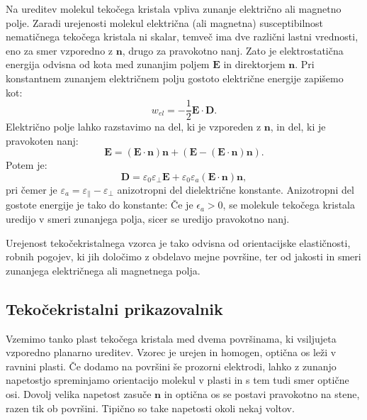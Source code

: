 Na ureditev molekul tekočega kristala vpliva zunanje električno ali magnetno polje.
Zaradi urejenosti molekul električna (ali magnetna) susceptibilnost nematičnega tekočega
kristala ni skalar, temveč ima dve različni lastni vrednosti,
eno za smer vzporedno z $\mathbf{n}$, drugo za pravokotno nanj. Zato je
elektrostatična energija odvisna od kota med zunanjim poljem $\mathbf{E}$
in direktorjem $\mathbf{n}$. Pri konstantnem zunanjem električnem polju 
gostoto električne energije zapišemo kot:
\begin{equation}
w_{el}=-\frac{1}{2}\mathbf{E}\cdot \mathbf{D}.
\label{lcwe}
\end{equation}
Električno polje lahko razstavimo na del, ki je vzporeden z $\mathbf{n}$, in del, ki je
pravokoten nanj:
\begin{equation}
\mathbf{E} = (\mathbf{E} \cdot \mathbf{n}) \mathbf{n} + \left( \mathbf{E} - 
(\mathbf{E} \cdot \mathbf{n}) \mathbf{n} \right)\!\!.
\end{equation}
Potem je:
\begin{equation}
\mathbf{D} = \varepsilon_0 \varepsilon_\bot \mathbf{E} + \varepsilon_0 \varepsilon_a
(\mathbf{E}\cdot\mathbf{n})\mathbf{n},
\label{7.56a}
\end{equation}
pri čemer je $\varepsilon_a = \varepsilon_\parallel - \varepsilon_\bot$ anizotropni
del dielektrične konstante. Anizotropni del gostote energije je tako do konstante:
Če je $\epsilon_{a}>0$, se molekule tekočega kristala uredijo v smeri 
zunanjega polja, sicer se uredijo pravokotno nanj.

Urejenost tekočekristalnega vzorca je tako odvisna od orientacijske
elastičnosti, robnih pogojev, ki jih določimo z obdelavo mejne
površine, ter od jakosti in smeri zunanjega električnega ali magnetnega polja.

\subsection*{Tekočekristalni prikazovalnik}
Vzemimo tanko plast tekočega kristala med dvema površinama, ki vsiljujeta
vzporedno planarno ureditev. Vzorec je urejen in homogen, optična os leži v ravnini 
plasti. Če dodamo na površini še prozorni elektrodi, lahko
z zunanjo napetostjo spreminjamo orientacijo molekul v plasti in s tem tudi 
smer optične osi. Dovolj velika napetost zasuče $\mathbf{n}$ in optična os
se postavi pravokotno na stene, razen tik ob površini. Tipično so take napetosti okoli 
nekaj voltov.

